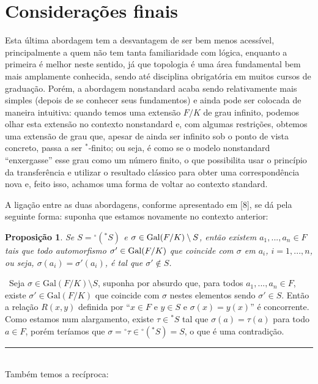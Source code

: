 \documentclass[12pt,a4paper]{article}
\newtheorem{prop}[mydef]{Proposição}
\def\dem{\par\smallbreak\noindent {\textit{ Demonstração:}} \ }
\def\eop{\hfill\rule{2.5mm}{2.5mm} \\ }
\theoremstyle{definition}
\begin{document}
\section{Considerações finais}

Esta última abordagem tem a desvantagem de ser bem menos acessível, principalmente a quem não tem tanta familiaridade com lógica, enquanto a primeira é melhor neste sentido, já que topologia é uma área fundamental bem mais amplamente conhecida, sendo até disciplina obrigatória em muitos cursos de graduação. Porém, a abordagem nonstandard acaba sendo relativamente mais simples (depois de se conhecer seus fundamentos) e ainda pode ser colocada de maneira intuitiva: quando temos uma extensão $F/K$ de grau infinito, podemos olhar esta extensão no contexto nonstandard e, com algumas restrições, obtemos uma extensão de grau que, apesar de ainda ser infinito sob o ponto de vista concreto, passa a ser $^*$-finito; ou seja, é como se o modelo nonstandard ``enxergasse'' esse grau como um número finito, o que possibilita usar o princípio da transferência e utilizar o resultado clássico para obter uma correspondência nova e, feito isso, achamos uma forma de voltar ao contexto standard.

A ligação entre as duas abordagens, conforme apresentado em [8], se dá pela seguinte forma: suponha que estamos novamente no contexto anterior:

\begin{prop}
    
    Se $S={^\circ({^*S})}$ e $\sigma \in \text{\upshape Gal\itshape}({F}/{K})\setminus S$, então existem $a_1,...,a_n\in F$ tais que todo automorfismo $\sigma' \in \text{\upshape Gal\itshape}({F}/{K})$ que coincide com $\sigma$ em $a_i$, $i=1,...,n$, ou seja, $\sigma(a_i)=\sigma'(a_i)$, é tal que $\sigma'\notin S$. 
    
\end{prop}

\dem Seja $\sigma \in \text{Gal}(F/K)\setminus S$, suponha por absurdo que, para todos $a_1,...,a_n\in F$, existe $\sigma'\in \text{Gal}(F/K)$ que coincide com $\sigma$ nestes elementos sendo $\sigma'\in S$. Então a relação $R(x,y)$ definida por ``$x\in F$ e $y\in S$ e $\sigma(x)=y(x)$'' é concorrente. Como estamos num alargamento, existe $\tau \in {^*S}$ tal que $\sigma(a)=\tau(a)$ para todo $a\in F$, porém teríamos que $\sigma={^\circ \tau}\in {^\circ({^*S})} = S$, o que é uma contradição. \eop

Também temos a recíproca:
\end{document}
